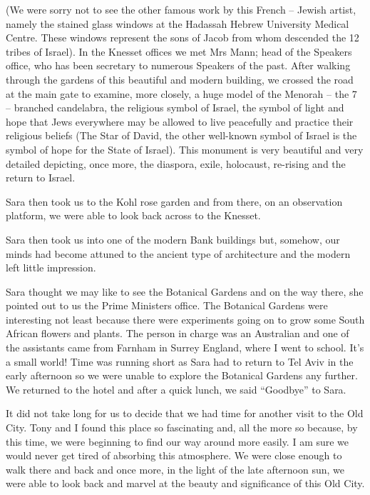 (We were sorry not to see the other famous work by this French --
Jewish artist, namely the stained glass windows at the Hadassah Hebrew
University Medical Centre. These windows represent the sons of Jacob
from whom descended the 12 tribes of Israel). In the Knesset offices
we met Mrs Mann; head of the Speakers office, who has been secretary
to numerous Speakers of the past. After walking through the gardens of
this beautiful and modern building, we crossed the road at the main
gate to examine, more closely, a huge model of the Menorah -- the 7 --
branched candelabra, the religious symbol of Israel, the symbol of
light and hope that Jews everywhere may be allowed to live peacefully
and practice their religious beliefs (The Star of David, the other
well-known symbol of Israel is the symbol of hope for the State of
Israel). This monument is very beautiful and very detailed depicting,
once more, the diaspora, exile, holocaust, re-rising and the return to
Israel.

Sara then took us to the Kohl rose garden and from there, on an
observation platform, we were able to look back across to the Knesset.

Sara then took us into one of the modern Bank buildings but, somehow,
our minds had become attuned to the ancient type of architecture and
the modern left little impression.

Sara thought we may like to see the Botanical Gardens and on the way
there, she pointed out to us the Prime Ministers office. The Botanical
Gardens were interesting not least because there were experiments
going on to grow some South African flowers and plants. The person in
charge was an Australian and one of the assistants came from Farnham
in Surrey England, where I went to school. It's a small world! Time
was running short as Sara had to return to Tel Aviv in the early
afternoon so we were unable to explore the Botanical Gardens any
further. We returned to the hotel and after a quick lunch, we said
``Goodbye'' to Sara.

It did not take long for us to decide that we had time for another
visit to the Old City. Tony and I found this place so fascinating and,
all the more so because, by this time, we were beginning to find our
way around more easily. I am sure we would never get tired of
absorbing this atmosphere. We were close enough to walk there and back
and once more, in the light of the late afternoon sun, we were able to
look back and marvel at the beauty and significance of this Old City.

